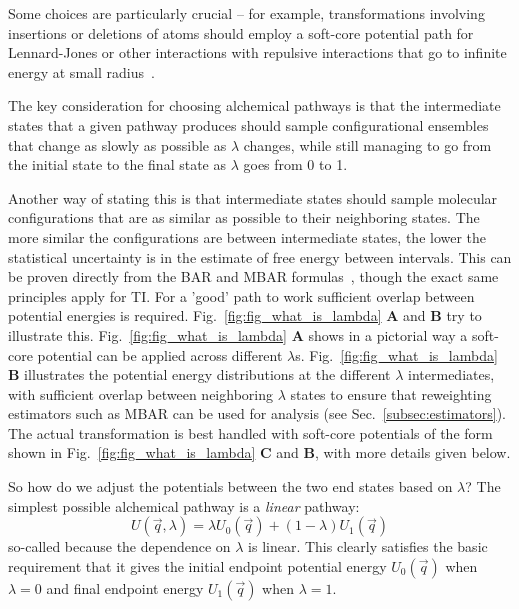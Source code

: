 \documentclass[9pt,bestpractices]{livecoms}
\begin{document}
Some choices are particularly crucial -- for example, transformations involving insertions or deletions of atoms should employ a soft-core potential path for Lennard-Jones or other interactions with repulsive interactions that go to infinite energy at small radius~\cite{beutler1994avoiding, beutler1994molecular,gapsys2012new}.

The key consideration for choosing alchemical pathways is that the intermediate states that a given pathway produces should sample configurational ensembles that change as slowly as possible as $\lambda$ changes, while still managing to go from the initial state to the final state as $\lambda$ goes from 0 to 1.

Another way of stating this is that intermediate states should sample molecular configurations that are as similar as possible to their neighboring states. The more similar the configurations are between intermediate states, the lower the statistical uncertainty is in the estimate of free energy between intervals. This can be proven directly from the BAR and MBAR formulas~\cite{bennett1976efficient,klimovich2015guidelines}, though the exact same principles apply for TI. For a 'good' path to work sufficient overlap between potential energies is required. Fig.~\ref{fig:fig_what_is_lambda} \textbf{A} and \textbf{B} try to illustrate this. Fig.~\ref{fig:fig_what_is_lambda} \textbf{A} shows in a pictorial way a soft-core potential can be applied across different $\lambda$s. Fig.~\ref{fig:fig_what_is_lambda} \textbf{B} illustrates the potential energy distributions at the different $\lambda$ intermediates, with sufficient overlap between neighboring $\lambda$ states to ensure that reweighting estimators such as MBAR can be used for analysis (see Sec.~\ref{subsec:estimators}). The actual transformation is best handled with soft-core potentials of the form shown in Fig.~\ref{fig:fig_what_is_lambda} \textbf{C} and \textbf{B}, with more details given below. 

So how do we adjust the potentials between the two end states based on $\lambda$? The simplest possible alchemical pathway is a \textit{linear} pathway:
\begin{equation}
U(\vec{q},\lambda) = \lambda U_0(\vec{q}) + (1-\lambda)U_1(\vec{q})   
\end{equation}
%
so-called because the dependence on $\lambda$ is linear. This clearly satisfies the basic requirement that it gives the initial endpoint potential energy $U_0(\vec{q})$ when $\lambda=0$ and final endpoint energy $U_1(\vec{q})$ when $\lambda=1$. 
\end{document}
